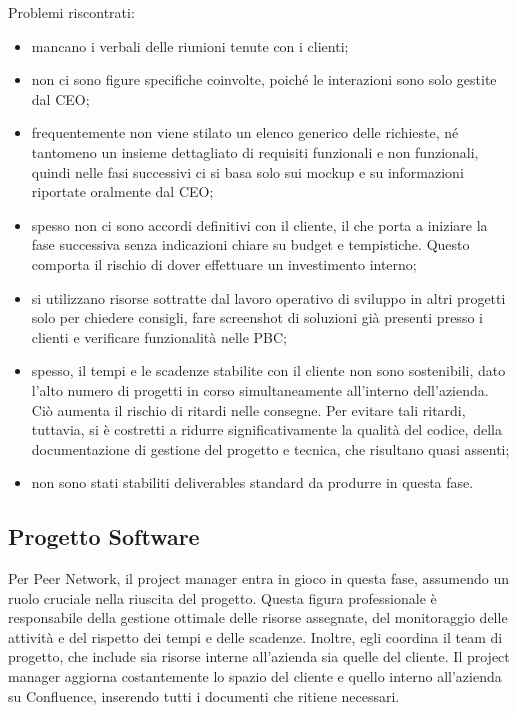    Problemi riscontrati:
    \begin{itemize}
        \item mancano i verbali delle riunioni tenute con i clienti;
        \item non ci sono figure specifiche coinvolte, poiché le interazioni sono solo gestite dal CEO;
        \item frequentemente non viene stilato un elenco generico delle richieste, né tantomeno un insieme dettagliato
        di requisiti funzionali e non funzionali, quindi nelle fasi successivi ci si basa solo sui mockup e
        su informazioni riportate oralmente dal CEO;
        \item spesso non ci sono accordi definitivi con il cliente, il che porta a iniziare la fase successiva senza indicazioni
        chiare su budget e tempistiche. Questo comporta il rischio di dover effettuare un investimento interno;
        \item si utilizzano risorse sottratte dal lavoro operativo di sviluppo in altri progetti solo per chiedere consigli,
        fare screenshot di soluzioni già presenti presso i clienti e verificare funzionalità nelle \ac{PBC};
        \item spesso, il tempi e le scadenze stabilite con il cliente non sono sostenibili, dato l'alto numero di progetti in
        corso simultaneamente all'interno dell'azienda. Ciò aumenta il rischio di ritardi nelle consegne. Per evitare tali ritardi,
        tuttavia, si è costretti a ridurre significativamente la qualità del codice, della documentazione di gestione del progetto e tecnica,
        che risultano quasi assenti;
        \item non sono stati stabiliti deliverables standard da produrre in questa fase.
    \end{itemize}

    \subsection{Progetto Software}
    Per Peer Network, il project manager entra in gioco in questa fase, assumendo un ruolo cruciale nella riuscita del progetto.
    Questa figura professionale è responsabile della gestione ottimale delle risorse assegnate, del monitoraggio delle attività
    e del rispetto dei tempi e delle scadenze. Inoltre, egli coordina il team di progetto, che include sia risorse interne all'azienda
    sia quelle del cliente. Il project manager aggiorna costantemente lo spazio del cliente e quello interno all'azienda su Confluence,
    inserendo tutti i documenti che ritiene necessari.

